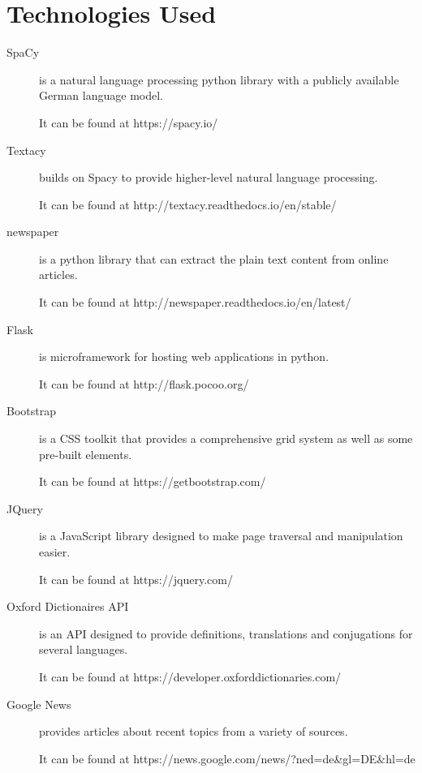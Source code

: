 \chapter{Technologies Used}

\begin{description}
	\item[SpaCy] is a natural language processing python library with a publicly available German language model. 
	
	It can be found at https://spacy.io/
	
	\item[Textacy] builds on Spacy to provide higher-level natural language processing. 
	
	It can be found at http://textacy.readthedocs.io/en/stable/ 
	
	\item[newspaper] is a python library that can extract the plain text content from online articles. 
	
	It can be found at http://newspaper.readthedocs.io/en/latest/ 
	
	\item[Flask] is microframework for hosting web applications in python. 
	
	It can be found at http://flask.pocoo.org/
	
	\item[Bootstrap] is a CSS toolkit that provides a comprehensive grid system as well as some pre-built elements. 
	
	It can be found at https://getbootstrap.com/
	
	\item[JQuery] is a JavaScript library designed to make page traversal and manipulation easier.
	
	It can be found at https://jquery.com/
	
	\item[Oxford Dictionaires API] is an API designed to provide definitions, translations and conjugations for several languages. 
	
	It can be found at https://developer.oxforddictionaries.com/
	
	\item[Google News] provides articles about recent topics from a variety of sources. 
	
	It can be found at https://news.google.com/news/?ned=de\&gl=DE\&hl=de
\end{description}